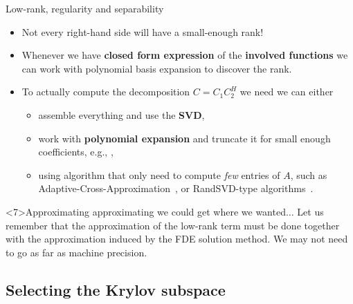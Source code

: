 \documentclass[aspectratio=169,xcolor=dvipsnames]{beamer}
\begin{document}
	\begin{frame}{Low-rank, regularity and separability}
	\begin{itemize}
		\item[\faEye]<1-> Not every right-hand side will have a small-enough rank!
		\item[\faHammer]<2-> Whenever we have \textbf{closed form expression} of the \textbf{involved functions} we can work with polynomial basis expansion to discover the rank.
		\item[\faCog]<3-> To actually compute the decomposition $C = C_1 C_2^H$ we need we can either
		\begin{itemize}
			\item[\faBomb]<4-> \normalsize assemble everything and use the \textbf{SVD},
			\item[\faHammer]<5-> \normalsize work with \textbf{polynomial expansion} and truncate it for small enough coefficients, e.g., \parencite{carvajal2005hybrid,MR3138114,MR3947283},
			\item[\faBarcode]<6-> \normalsize using algorithm that only need to compute \emph{few} entries of $A$, such as Adaptive-Cross-Approximation~\parencite{MR1783468}, or RandSVD-type algorithms~\parencite{MR2806637}.
		\end{itemize}
	\end{itemize}
	
	\begin{block}{\faExclamationCircle\;\;Approximating approximating we could get where we wanted$\ldots$}
	Let us remember that the approximation of the low-rank term must be done together with the approximation induced by the FDE solution method. We may not need to go as far as machine precision.
	\end{block}
	
	\end{frame}

	\subsection{Selecting the Krylov subspace}
	
\end{document}

